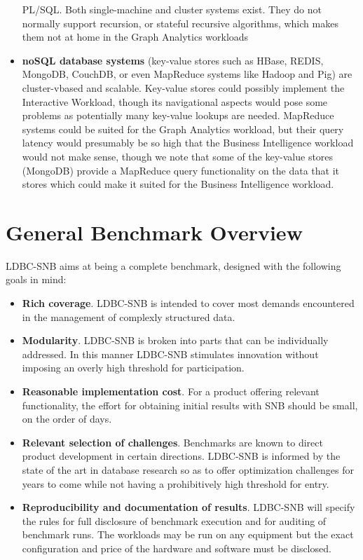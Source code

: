 \begin{itemize}
     PL/SQL. Both single-machine and cluster systems exist.  They  do not
     normally support recursion, or stateful recursive algorithms, which makes
     them not at home in the Graph Analytics workloads
 \item \textbf{noSQL database systems} (\eg key-value stores such as HBase,
     REDIS, MongoDB, CouchDB, or even MapReduce systems like Hadoop and Pig)
     are cluster-vbased and scalable. Key-value stores could possibly implement
     the Interactive Workload, though its navigational aspects would pose some
     problems as potentially many key-value lookups are needed. MapReduce
     systems could be suited for the Graph Analytics workload, but their query
     latency would presumably be so high that the Business Intelligence
     workload would not make sense, though we note that some of the key-value
     stores (\eg MongoDB) provide a MapReduce query functionality on the data
     that it stores which could make it suited for the Business Intelligence workload.
\end{itemize}


\section{General Benchmark Overview}

LDBC-SNB aims at being a complete benchmark, designed with the following goals in mind:

\begin{itemize}
 \item \textbf{Rich coverage}. LDBC-SNB is intended to cover most demands
     encountered in the management of complexly structured data.
 \item \textbf{Modularity}. LDBC-SNB is broken into parts that can be
     individually addressed. In this manner LDBC-SNB
     stimulates innovation without imposing an overly high threshold for
     participation.
 \item \textbf{Reasonable implementation cost}. For a product offering relevant
     functionality, the effort for obtaining initial results with SNB should be
     small, on the order of days.
 \item \textbf{Relevant selection of challenges}. Benchmarks are known to
     direct product development in certain directions. LDBC-SNB is informed by
     the state of the art in database research so as to offer optimization
     challenges for years to come while not having a prohibitively high
     threshold for entry.
 \item \textbf{Reproducibility and documentation of results}. LDBC-SNB
     will specify the rules for full disclosure of benchmark execution and for
     auditing of benchmark runs. The workloads may be run on any equipment
     but the exact configuration and price of the hardware and software must be
     disclosed.
\end{itemize}


